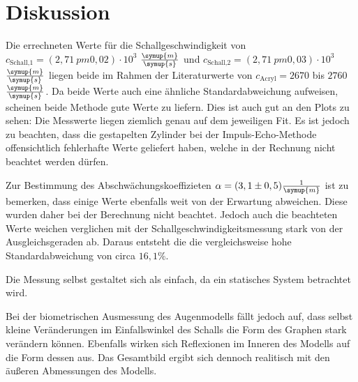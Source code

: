 \section{Diskussion}
\label{sec:Diskussion}


Die errechneten Werte für die Schallgeschwindigkeit von $c_\text{Schall,1} = (2,71 \ pm 0,02) \cdot 10^{3}$ $\frac{\symup{m}}{\symup{s}}$ und $c_\text{Schall,2} = (2,71 \ pm 0,03) \cdot 10^{3}$ $\frac{\symup{m}}{\symup{s}}$
liegen beide im Rahmen der Literaturwerte von $c_\text{Acryl} = 2670$ bis $2760$ $\frac{\symup{m}}{\symup{s}}$\cite{acryl}.
Da beide Werte auch eine ähnliche Standardabweichung aufweisen, scheinen beide Methode gute Werte zu liefern. Dies ist auch gut an den Plots zu sehen:
Die Messwerte liegen ziemlich genau auf dem jeweiligen Fit.
Es ist jedoch zu beachten, dass die gestapelten Zylinder bei der Impuls-Echo-Methode offensichtlich fehlerhafte Werte geliefert haben, welche in der Rechnung nicht beachtet werden dürfen.

Zur Bestimmung des Abschwächungskoeffizieten $\alpha = (3,1 \pm 0,5) \frac{1}{\symup{m}}$ ist zu bemerken, dass einige Werte ebenfalls weit von der Erwartung abweichen. Diese wurden daher bei der Berechnung nicht beachtet.
Jedoch auch die beachteten Werte weichen verglichen mit der Schallgeschwindigkeitsmessung stark von der Ausgleichsgeraden ab.
Daraus entsteht die die vergleichsweise hohe Standardabweichung von circa $16,1 \%$.

Die Messung selbst gestaltet sich als einfach, da ein statisches System betrachtet wird.

Bei der biometrischen Ausmessung des Augenmodells fällt jedoch auf, dass selbst kleine Veränderungen im Einfallswinkel des Schalls die Form des Graphen stark verändern können.
Ebenfalls wirken sich Reflexionen im Inneren des Modells auf die Form dessen aus. Das Gesamtbild ergibt sich dennoch realitisch mit den äußeren Abmessungen des Modells.
